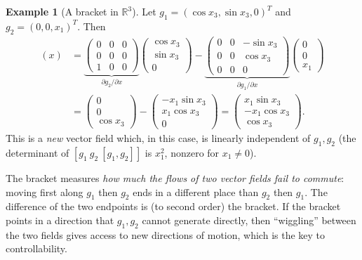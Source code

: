\documentclass[11pt,a4paper]{article}
\newcommand{\R}{\mathbb{R}}
\newcommand{\LB}[2]{[#1,#2]}
\theoremstyle{plain}
\theoremstyle{definition}
\newtheorem{example}[theorem]{Example}
\theoremstyle{remark}
\begin{document}
\begin{example}[A bracket in $\R^3$]
\label{ex:lb3}
Let $g_1=(\cos x_3,\sin x_3,0)^T$ and $g_2=(0,0,x_1)^T$. Then
\begin{align*}
\LB{g_1}{g_2}(x)&=
\underbrace{\begin{pmatrix}0&0&0\\0&0&0\\1&0&0\end{pmatrix}}_{\partial g_2/\partial x}\begin{pmatrix}\cos x_3\\\sin x_3\\0\end{pmatrix}
-\underbrace{\begin{pmatrix}0&0&-\sin x_3\\0&0&\cos x_3\\0&0&0\end{pmatrix}}_{\partial g_1/\partial x}\begin{pmatrix}0\\0\\x_1\end{pmatrix}\\
&=\begin{pmatrix}0\\0\\\cos x_3\end{pmatrix}-\begin{pmatrix}-x_1\sin x_3\\x_1\cos x_3\\0\end{pmatrix}
=\begin{pmatrix}x_1\sin x_3\\-x_1\cos x_3\\\cos x_3\end{pmatrix}.
\end{align*}
This is a \emph{new} vector field which, in this case, is linearly independent of $g_1,g_2$ (the determinant of $[g_1\ g_2\ \LB{g_1}{g_2}]$ is $x_1^2$, nonzero for $x_1\neq0$).
\end{example}

\begin{intuition}
The bracket measures \emph{how much the flows of two vector fields fail to commute}: moving first along $g_1$ then $g_2$ ends in a different place than $g_2$ then $g_1$. The difference of the two endpoints is (to second order) the bracket. If the bracket points in a direction that $g_1,g_2$ cannot generate directly, then ``wiggling'' between the two fields gives access to new directions of motion, which is the key to controllability.
\end{intuition}
\end{document}

